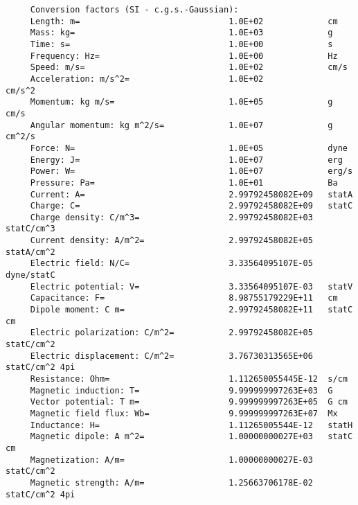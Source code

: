 \documentclass[12pt,a4paper]{article}
\begin{document}
\begin{verbatim}
     Conversion factors (SI - c.g.s.-Gaussian):
     Length: m=                              1.0E+02             cm
     Mass: kg=                               1.0E+03             g
     Time: s=                                1.0E+00             s
     Frequency: Hz=                          1.0E+00             Hz
     Speed: m/s=                             1.0E+02             cm/s
     Acceleration: m/s^2=                    1.0E+02             cm/s^2
     Momentum: kg m/s=                       1.0E+05             g cm/s
     Angular momentum: kg m^2/s=             1.0E+07             g cm^2/s
     Force: N=                               1.0E+05             dyne
     Energy: J=                              1.0E+07             erg
     Power: W=                               1.0E+07             erg/s
     Pressure: Pa=                           1.0E+01             Ba
     Current: A=                             2.99792458082E+09   statA
     Charge: C=                              2.99792458082E+09   statC
     Charge density: C/m^3=                  2.99792458082E+03   statC/cm^3
     Current density: A/m^2=                 2.99792458082E+05   statA/cm^2
     Electric field: N/C=                    3.33564095107E-05   dyne/statC
     Electric potential: V=                  3.33564095107E-03   statV
     Capacitance: F=                         8.98755179229E+11   cm
     Dipole moment: C m=                     2.99792458082E+11   statC cm
     Electric polarization: C/m^2=           2.99792458082E+05   statC/cm^2
     Electric displacement: C/m^2=           3.76730313565E+06   statC/cm^2 4pi
     Resistance: Ohm=                        1.112650055445E-12  s/cm
     Magnetic induction: T=                  9.999999997263E+03  G
     Vector potential: T m=                  9.999999997263E+05  G cm
     Magnetic field flux: Wb=                9.999999997263E+07  Mx
     Inductance: H=                          1.11265005544E-12   statH
     Magnetic dipole: A m^2=                 1.00000000027E+03   statC cm
     Magnetization: A/m=                     1.00000000027E-03   statC/cm^2
     Magnetic strength: A/m=                 1.25663706178E-02   statC/cm^2 4pi


\end{verbatim}
\end{document}
